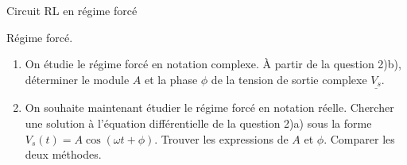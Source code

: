 \begin{exo}[MPSI]{Circuit RL en régime forcé}
\begin{quest}


\item Régime forcé.
\begin{enumerate}[label=\alph{*})]
\item On étudie le régime forcé en notation complexe. À partir de la question 2)b), déterminer le module $A$ et la phase $\phi$ de la tension de sortie complexe $\underline{V_s}$.


\item On souhaite maintenant étudier le régime forcé en notation réelle. Chercher une solution à l'équation différentielle de la question 2)a) sous la forme $V_s(t) = A \cos(\omega t +\phi)$. Trouver les expressions de $A$ et $\phi$. Comparer les deux méthodes.

\end{enumerate}

\end{quest}
\end{exo}

